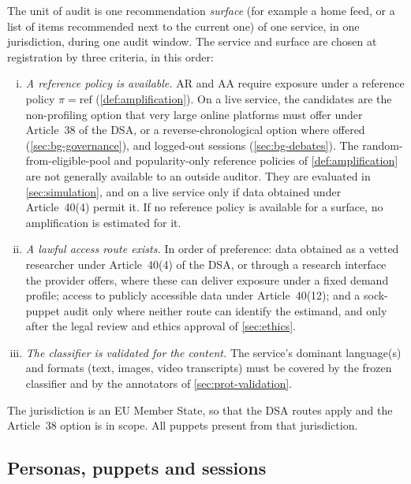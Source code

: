 The unit of audit is one recommendation \emph{surface} (for example a home feed, or a list of items recommended next to the current one) of one service, in one jurisdiction, during one audit window. The service and surface are chosen at registration by three criteria, in this order:
\begin{enumerate}[(i)]
  \item \emph{A reference policy is available.} AR and AA require exposure under a reference policy $\pi=\mathrm{ref}$ (\cref{def:amplification}). On a live service, the candidates are the non-profiling option that very large online platforms must offer under Article~38 of the DSA, or a reverse-chronological option where offered (\cref{sec:bg-governance}), and logged-out sessions (\cref{sec:bg-debates}). The random-from-eligible-pool and popularity-only reference policies of \cref{def:amplification} are not generally available to an outside auditor. They are evaluated in \cref{sec:simulation}, and on a live service only if data obtained under Article~40(4) permit it. If no reference policy is available for a surface, no amplification is estimated for it.
  \item \emph{A lawful access route exists.} In order of preference: data obtained as a vetted researcher under Article~40(4) of the DSA, or through a research interface the provider offers, where these can deliver exposure under a fixed demand profile; access to publicly accessible data under Article~40(12); and a sock-puppet audit only where neither route can identify the estimand, and only after the legal review and ethics approval of \cref{sec:ethics}.
  \item \emph{The classifier is validated for the content.} The service's dominant language(s) and formats (text, images, video transcripts) must be covered by the frozen classifier and by the annotators of \cref{sec:prot-validation}.
\end{enumerate}
The jurisdiction is an EU Member State, so that the DSA routes apply and the Article~38 option is in scope. All puppets present from that jurisdiction.

\subsection{Personas, puppets and sessions}\label{sec:prot-personas}

